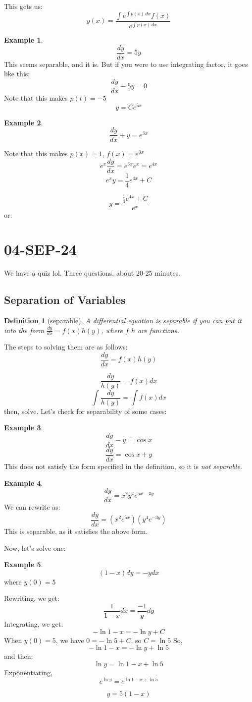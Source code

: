 \documentclass{article}
\newtheorem{defn}{Definition}
\theoremstyle{definition}
\newtheorem{example}{Example}[section]
\begin{document}
This gets us:
\[y(x) = \frac{\int{e^{\int{p(x) \, dx}} f(x)}}{e^{\int{p(x) \, dx}}}\]

\begin{example}
    \[\frac{dy}{dx} = 5y\]
This seems separable, and it is. But if you were to use integrating factor, it goes like this:
\[
    \frac{dy}{dx} - 5y = 0
\]
Note that this makes $p(t) = -5$
\[
y = Ce^{5x}
\]
\end{example}

\begin{example}
    \[\frac{dy}{dx} + y = e^{3x}\]

Note that this makes $p(x) = 1$, $f(x) = e^{3x}$
\[
e^{x}\frac{dy}{dx} = e^{3x}e^x = e^{4x}
\]
\[
e^{x}y = \frac{1}{4}e^{4x} + C
\]

\[
y = \frac{\frac{1}{4}e^{4x} + C}{e^{x}}
\]
or:
\end{example}
\section{04-SEP-24}
We have a quiz lol. Three questions, about 20-25 minutes. 
\subsection{Separation of Variables}
\begin{defn}[separable]
A differential equation is separable if you can put it into the form  $\frac{dy}{dx} = f(x)h(y)$, where $f$ $h$ are functions. 
\end{defn}
The steps to solving them are as follows:
\[ 
    \frac{dy}{dx} = f(x)h(y)
\]

\[ 
    \frac{dy}{h(y)} = f(x)dx
\]
\[ 
    \int{\frac{dy}{h(y)}} = \int{f(x)dx}
\]
then, solve. 
Let's check for separability of some cases:
\begin{example}
   \[\frac{dy}{dx} - y = \cos{x}\]
   \[\frac{dy}{dx} = \cos{x} + y\]
   This does not satisfy the form specified in the definition, so it is \textit{not separable}.
\end{example}
\begin{example}
    \[\frac{dy}{dx} = x^2y^4e^{5x-3y}\]
    We can rewrite as:
    \[\frac{dy}{dx} = (x^2e^{5x})(y^4e^{-3y})\]
    This is separable, as it satisfies the above form. 
 \end{example}
Now, let's solve one: 
\begin{example}
    \[(1-x)dy = -ydx \]
where $y(0) = 5$

Rewriting, we get:
\[\frac{1}{1-x}dx = \frac{-1}{y}dy \]
Integrating, we get:
\[ - \ln{1-x} = - \ln{y} + C\]
When $y(0) = 5$, we have $0 = - \ln{5} + C$, so $C = \ln{5}$
So, \[ - \ln{1-x} = - \ln{y} + \ln{5}\]
and then:
\[\ln{y} = \ln{1-x} + \ln{5}\] 
Exponentiating, 
\[e^{\ln{y}} = e^{\ln{1-x} + \ln{5}} \]

\[y = 5(1-x) \]
\end{example}
\end{document}
